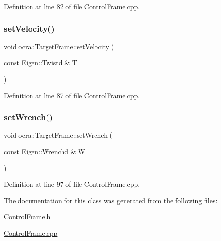Definition at line 82 of file Control\+Frame.\+cpp.

\hypertarget{classocra_1_1TargetFrame_aff778ddb4526e90b927ec12bda52e8d6}{}\label{classocra_1_1TargetFrame_aff778ddb4526e90b927ec12bda52e8d6} 
\subsubsection{\texorpdfstring{set\+Velocity()}{setVelocity()}}
{\footnotesize\ttfamily void ocra\+::\+Target\+Frame\+::set\+Velocity (\begin{DoxyParamCaption}\item[{const Eigen\+::\+Twistd \&}]{T }\end{DoxyParamCaption})}



Definition at line 87 of file Control\+Frame.\+cpp.

\hypertarget{classocra_1_1TargetFrame_a3d8e094de52e69b626322b6cce57d23e}{}\label{classocra_1_1TargetFrame_a3d8e094de52e69b626322b6cce57d23e} 
\subsubsection{\texorpdfstring{set\+Wrench()}{setWrench()}}
{\footnotesize\ttfamily void ocra\+::\+Target\+Frame\+::set\+Wrench (\begin{DoxyParamCaption}\item[{const Eigen\+::\+Wrenchd \&}]{W }\end{DoxyParamCaption})}



Definition at line 97 of file Control\+Frame.\+cpp.



The documentation for this class was generated from the following files\+:\begin{DoxyCompactItemize}
\item 
\hyperlink{ControlFrame_8h}{Control\+Frame.\+h}\item 
\hyperlink{ControlFrame_8cpp}{Control\+Frame.\+cpp}\end{DoxyCompactItemize}
